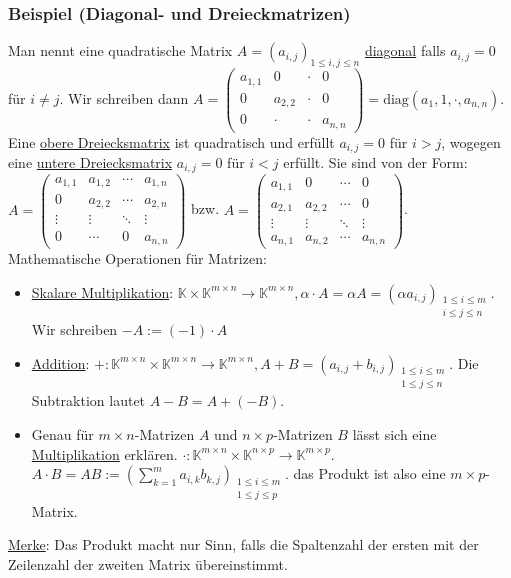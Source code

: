 \subsubsection{Beispiel (Diagonal- und Dreieckmatrizen)}
Man nennt eine quadratische Matrix $A=(a_{i,j})_{1\leq i,j\leq n}$ \underline{diagonal} falls $a_{i,j}=0$ für $i\not=j$.  Wir schreiben dann $A=\left(\begin{array}{cccc}a_{1,1} & 0 & \cdot & 0\\ 0 & a_{2,2} &\cdot & 0\\ 0 &\cdot &\cdot & a_{n,n}\end{array}\right)=\text{diag}(a_1,1,\cdot ,a_{n,n})$.  Eine \underline{obere Dreiecksmatrix} ist quadratisch und erfüllt $a_{i,j}=0$ für $i>j$, wogegen eine \underline{untere Dreiecksmatrix} $a_{i,j}=0$ für $i<j$ erfüllt.  Sie sind von der Form: $A=\left(\begin{array}{cccc}a_{1,1} & a_{1,2} & \cdots & a_{1,n}\\ 0 & a_{2,2} & \cdots & a_{2,n}\\ \vdots & \vdots & \ddots &\vdots \\ 0 & \cdots & 0 & a_{n,n}\end{array}\right)$ bzw. $A=\left(\begin{array}{cccc}a_{1,1} & 0 & \cdots & 0\\a_{2,1} & a_{2,2} & \cdots & 0 \\ \vdots & \vdots & \ddots &\vdots \\ a_{n,1} & a_{n,2}  &\cdots & a_{n,n}\end{array}\right)$.\\
Mathematische Operationen für Matrizen:
\begin{itemize}
\item \underline{Skalare Multiplikation}: $\mathbb{K}\times \mathbb{K}^{m\times n} \rightarrow \mathbb{K}^{m\times n}, \alpha \cdot A= \alpha A=(\alpha a_{i,j})_{\substack{1\leq i\leq m \\ i\leq j\leq n}}$.  Wir schreiben $-A:=(-1)\cdot A$
\item \underline{Addition}: $+:\mathbb{K}^{m\times n}\times \mathbb{K}^{m\times n} \rightarrow \mathbb{K}^{m\times n},A+B=(a_{i,j}+b_{i,j})_{\substack{1\leq i\leq m \\ 1\leq j\leq n}}$.  Die Subtraktion lautet $A-B=A+(-B)$.
\item Genau für $m\times n$-Matrizen $A$ und $n\times p$-Matrizen $B$ lässt sich eine \underline{Multiplikation} erklären.  $\cdot : \mathbb{K}^{m\times n}\times \mathbb{K}^{n\times p}\rightarrow \mathbb{K}^{m\times p}$.  $A\cdot B=AB:=(\sum^m_{k=1} a_{i,k}b_{k,j})_{\substack{1\leq i\leq m\\1\leq j\leq p}}$. das Produkt ist also eine $m\times p$-Matrix.
\end{itemize}
\underline{Merke}: Das Produkt macht nur Sinn, falls die Spaltenzahl der ersten mit der Zeilenzahl der zweiten Matrix übereinstimmt.

